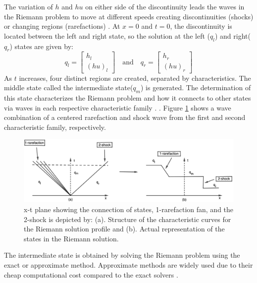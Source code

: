 \documentclass[11pt,a4paper]{article}
\newcommand{\donna}[1]{{\color{red}{#1}}}
\newcommand{\ignore}[1]{}
\begin{document}
	The variation of $h$ and $hu$ on either side of the discontinuity leads the waves in the Riemann problem to move at different speeds creating discontinuities (shocks) or changing regions (rarefactions) \cite{leveque2002finite}.  At $x = 0$ and $t = 0$,   the discontinuity is located between the left and right state, so the solution at the left ($q_{l}$) and right($q_{r}$) states are given by: 
	\begin{equation}
		q_{l} = \begin{bmatrix}
			h_{l} \\( hu)_{l}
		\end{bmatrix}  \quad \text{and} \quad q_{r} = \begin{bmatrix}
			h_{r} \\( hu)_{r}
		\end{bmatrix} 
		\label{ic}
	\end{equation}
	As $t$ increases, four distinct regions are created, separated by characteristics. The middle state called the intermediate state($q_{m}$) is generated.  The determination of this state characterizes the Riemann problem and how it connects to other states via waves in each respective characteristic family \donna{no citation needed here} \cite{ba-le-mi-ro:2003}.  \donna{The selection of rarefaction or shock is based on the well-known Lax entropy condition.   For the the SWEs, this condition reduces to hm > hl (??). }.  \ignore{This can only hold if the connection wave speeds satisfy the Lax entropy condition.} Figure \ref{fig:x-tplane} shows a wave combination of a centered rarefaction and shock wave from the first and second characteristic family, respectively.
	
	\begin{figure}[H]
		\centering
		\includegraphics[width=1\linewidth]{images/geo1}
		\caption{ x-t plane showing the connection of states, 1-rarefaction fan, and the 2-shock is depicted by: (a). Structure of the characteristic curves for the  Riemann solution profile and (b). Actual representation of the states in the Riemann solution.}
		\label{fig:x-tplane}
	\end{figure}
	The intermediate state is obtained by solving the Riemann problem using the exact or approximate method. Approximate methods are widely used due to their cheap computational cost compared to the exact solvers \donna{cite Roe's original paper on approximate Riemann solvers.} \ignore{\cite{bu-ku-we-da:2009}}.
	
\end{document}
